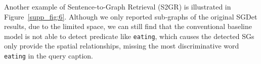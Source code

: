 \documentclass[10pt,twocolumn,letterpaper]{article}
\begin{document}
Another example of Sentence-to-Graph Retrieval (S2GR) is illustrated in Figure~\ref{supp_fig:6}. Although we only reported sub-graphs of the original SGDet results, due to the limited space, we can still find that the conventional baseline model is not able to detect predicate like \texttt{eating}, which causes the detected SGs only provide the spatial relationships, missing the most discriminative word \texttt{eating} in the query caption. 
\end{document}
